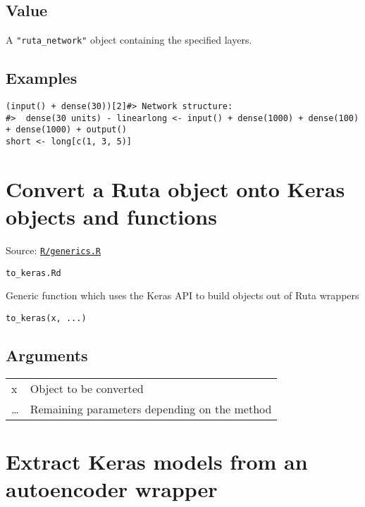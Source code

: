 \hypertarget{value}{\subsection{\texorpdfstring{\protect\hyperlink{value}{}Value}{Value}}\label{value}}

A \texttt{"ruta\_network"} object containing the specified layers.

\hypertarget{examples}{\subsection{\texorpdfstring{\protect\hyperlink{examples}{}Examples}{Examples}}\label{examples}}

\begin{verbatim}
(input() + dense(30))[2]#> Network structure:
#>  dense(30 units) - linearlong <- input() + dense(1000) + dense(100) + dense(1000) + output()
short <- long[c(1, 3, 5)]
\end{verbatim}

\section{Convert a Ruta object onto Keras objects and
functions}\label{convert-a-ruta-object-onto-keras-objects-and-functions}

Source:
\href{https://github.com/fdavidcl/ruta/blob/master/R/generics.R}{\texttt{R/generics.R}}

\texttt{to\_keras.Rd}

Generic function which uses the Keras API to build objects out of Ruta
wrappers

\begin{verbatim}
to_keras(x, ...)
\end{verbatim}

\hypertarget{arguments}{\subsection{\texorpdfstring{\protect\hyperlink{arguments}{}Arguments}{Arguments}}\label{arguments}}

\begin{longtable}[c]{@{}ll@{}}
\toprule
x & Object to be converted\tabularnewline
\ldots{} & Remaining parameters depending on the method\tabularnewline
\bottomrule
\end{longtable}

\section{Extract Keras models from an autoencoder
wrapper}\label{extract-keras-models-from-an-autoencoder-wrapper}

